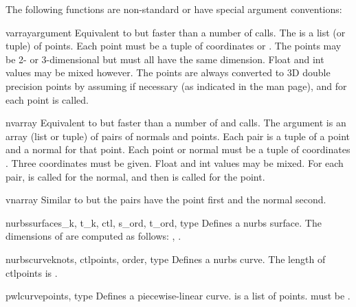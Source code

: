 The following functions are non-standard or have special argument
conventions:

\begin{funcdesc}{varray}{argument}
Equivalent to but faster than a number of
calls.
The  is a list (or tuple) of points.
Each point must be a tuple of coordinates
 or .
The points may be 2- or 3-dimensional but must all have the
same dimension.
Float and int values may be mixed however.
The points are always converted to 3D double precision points
by assuming  if necessary (as indicated in the man page),
and for each point
is called.
\end{funcdesc}

\begin{funcdesc}{nvarray}{}
Equivalent to but faster than a number of
and
calls.
The argument is an array (list or tuple) of pairs of normals and points.
Each pair is a tuple of a point and a normal for that point.
Each point or normal must be a tuple of coordinates
.
Three coordinates must be given.
Float and int values may be mixed.
For each pair,
is called for the normal, and then
is called for the point.
\end{funcdesc}

\begin{funcdesc}{vnarray}{}
Similar to 
but the pairs have the point first and the normal second.
\end{funcdesc}

\begin{funcdesc}{nurbssurface}{s_k, t_k, ctl, s_ord, t_ord, type}
Defines a nurbs surface.
The dimensions of
are computed as follows:
,
.
\end{funcdesc}

\begin{funcdesc}{nurbscurve}{knots, ctlpoints, order, type}
Defines a nurbs curve.
The length of ctlpoints is
.
\end{funcdesc}

\begin{funcdesc}{pwlcurve}{points, type}
Defines a piecewise-linear curve.
is a list of points.
must be
.
\end{funcdesc}

